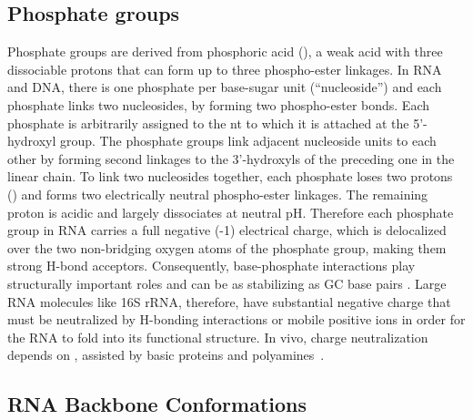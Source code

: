 \subsection{Phosphate groups}

Phosphate groups are derived from phosphoric acid (), a weak acid with
three dissociable protons that can form up to three phospho-ester linkages. In
RNA and DNA, there is one phosphate per base-sugar unit (``nucleoside'') and
each phosphate links two nucleosides, by forming two phospho-ester bonds. Each
phosphate is arbitrarily assigned to the nt to which it is attached at the
5’-hydroxyl group. The phosphate groups link adjacent nucleoside units to each
other by forming second linkages to the 3'-hydroxyls of the preceding one in the
linear chain. To link two nucleosides together, each phosphate loses two protons
() and forms two electrically neutral phospho-ester linkages. The
remaining proton is acidic and largely dissociates at neutral pH\@. Therefore each
phosphate group in RNA carries a full negative (-1) electrical charge, which is
delocalized over the two non-bridging oxygen atoms of the phosphate group,
making them strong H-bond acceptors. Consequently, base-phosphate interactions
play structurally important roles and can be as stabilizing as GC base pairs
\cite{Zirbel2009, Sponer2010}. Large RNA molecules like 16S rRNA, therefore,
have substantial negative charge that must be neutralized by H-bonding
interactions or mobile positive ions in order for the RNA to fold into its
functional structure. In vivo, charge neutralization depends on ,
assisted by basic proteins and polyamines~\cite{Draper2008}.

\subsection{RNA Backbone Conformations}

